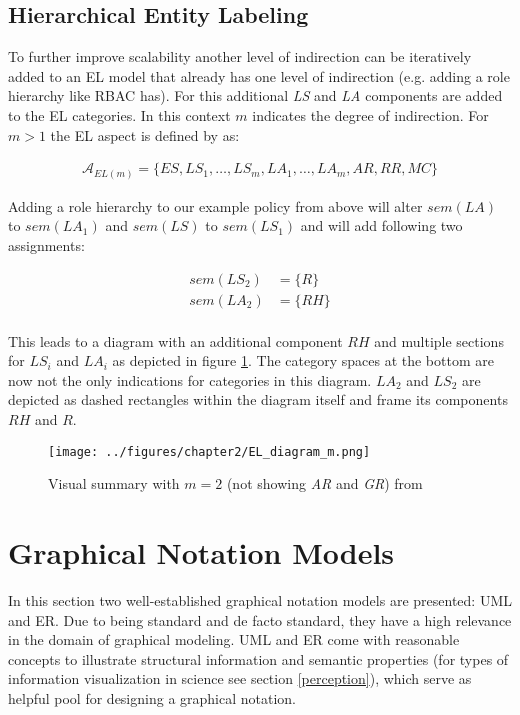 \documentclass[twoside, openright, 12pt]{book}
\begin{document}
\subsection{Hierarchical Entity Labeling}
\label{HEL}
To further improve scalability another level of indirection can be iteratively added to an EL model that already has one level of indirection (e.g. adding a role hierarchy like RBAC has).
For this additional \textit{LS} and \textit{LA} components are added to the EL categories.
In this context $m$ indicates the degree of indirection.
For $m>1$ the EL aspect is defined by \cite{Amthor18} as:

\begin{align*}
\mathcal{A}_{EL(m)} = \lbrace ES,LS_1, \dots,LS_m, LA_1, \dots, LA_m,AR,RR,MC\rbrace
\end{align*}

\noindent
Adding a role hierarchy to our example policy from above will alter $sem(LA)$ to $sem(LA_1)$ and $sem(LS)$ to $sem(LS_1)$ and will add following two assignments:

\begin{align*}
sem(LS_2) &= \lbrace R \rbrace\\
sem(LA_2) &= \lbrace RH \rbrace\\
\end{align*}

\noindent
This leads to a diagram with an additional component $RH$ and multiple sections for $LS_i$ and $LA_i$ as depicted in figure \ref{fig:EL_diagram_m}.
The category spaces at the bottom are now not the only indications for categories in this diagram.
$LA_2$ and $LS_2$ are depicted as dashed rectangles within the diagram itself and frame its components $RH$ and $R$.

\begin{figure}[htb]
	\centering
	\texttt{[image: ../figures/chapter2/EL\_diagram\_m.png]}
	\caption{Visual summary with $m=2$ (not showing \textit{AR} and \textit{GR}) from \cite[p.79, figure 4.4]{Amthor18}}
	\label{fig:EL_diagram_m}
\end{figure}



\section{Graphical Notation Models}
\label{graphical_notations}
In this section two well-established graphical notation models are presented: UML and ER.
Due to being standard and de facto standard, they have a high relevance in the domain of graphical modeling. 
UML and ER come with reasonable concepts to illustrate structural information and semantic properties (for types of information visualization in science see section \ref{perception}), which serve as helpful pool for designing a graphical notation.
\end{document}
